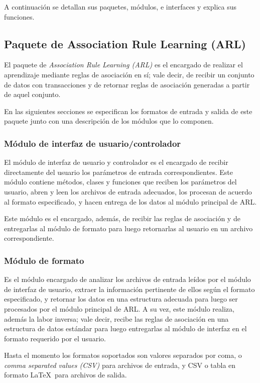 A continuación se detallan sus paquetes, módulos, e interfaces y explica sus funciones.

\subsection{Paquete de Association Rule Learning (ARL)}

El paquete de \textit{Association Rule Learning (ARL)} es el encargado de realizar el aprendizaje mediante reglas de asociación en sí; vale decir, de recibir un conjunto de datos con transacciones y de retornar reglas de asociación generadas a partir de aquel conjunto.

En las siguientes secciones se especifican los formatos de entrada y salida de este paquete junto con una descripción de los módulos que lo componen.

\subsubsection{Módulo de interfaz de usuario/controlador}

El módulo de interfaz de usuario y controlador es el encargado de recibir directamente del usuario los parámetros de entrada correspondientes. Este módulo contiene métodos, clases y funciones que reciben los parámetros del usuario, abren y leen los archivos de entrada adecuados, los procesan de acuerdo al formato especificado, y hacen entrega de los datos al módulo principal de ARL.

Este módulo es el encargado, además, de recibir las reglas de asociación y de entregarlas al módulo de formato para luego retornarlas al usuario en un archivo correspondiente.

\subsubsection{Módulo de formato}

Es el módulo encargado de analizar los archivos de entrada leídos por el módulo de interfaz de usuario, extraer la información pertinente de ellos según el formato especificado, y retornar los datos en una estructura adecuada para luego ser procesados por el módulo principal de ARL. A su vez, este módulo realiza, además la labor inversa; vale decir, recibe las reglas de asociación en una estructura de datos estándar para luego entregarlas al módulo de interfaz en el formato requerido por el usuario.

Hasta el momento los formatos soportados son valores separados por coma, o \textit{comma separated values (CSV)} para archivos de entrada, y CSV o tabla en formato \LaTeX\ para archivos de salida.

